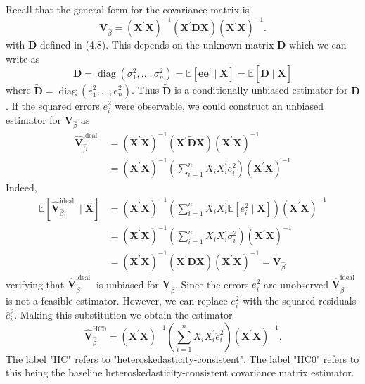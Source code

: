 \documentclass[10pt]{article}
\begin{document}
Recall that the general form for the covariance matrix is
$$
\boldsymbol{V}_{\widehat{\beta}}=\left(\boldsymbol{X}^{\prime} \boldsymbol{X}\right)^{-1}\left(\boldsymbol{X}^{\prime} \boldsymbol{D} \boldsymbol{X}\right)\left(\boldsymbol{X}^{\prime} \boldsymbol{X}\right)^{-1} .
$$
with $\boldsymbol{D}$ defined in (4.8). This depends on the unknown matrix $\boldsymbol{D}$ which we can write as
$$
\boldsymbol{D}=\operatorname{diag}\left(\sigma_{1}^{2}, \ldots, \sigma_{n}^{2}\right)=\mathbb{E}\left[\boldsymbol{e} \boldsymbol{e}^{\prime} \mid \boldsymbol{X}\right]=\mathbb{E}[\widetilde{\boldsymbol{D}} \mid \boldsymbol{X}]
$$
where $\widetilde{\boldsymbol{D}}=\operatorname{diag}\left(e_{1}^{2}, \ldots, e_{n}^{2}\right)$. Thus $\widetilde{\boldsymbol{D}}$ is a conditionally unbiased estimator for $\boldsymbol{D}$. If the squared errors $e_{i}^{2}$ were observable, we could construct an unbiased estimator for $\boldsymbol{V}_{\widehat{\beta}}$ as
$$
\begin{aligned}
\widehat{\boldsymbol{V}}_{\widehat{\beta}}^{\text {ideal }} &=\left(\boldsymbol{X}^{\prime} \boldsymbol{X}\right)^{-1}\left(\boldsymbol{X}^{\prime} \widetilde{\boldsymbol{D}} \boldsymbol{X}\right)\left(\boldsymbol{X}^{\prime} \boldsymbol{X}\right)^{-1} \\
&=\left(\boldsymbol{X}^{\prime} \boldsymbol{X}\right)^{-1}\left(\sum_{i=1}^{n} X_{i} X_{i}^{\prime} e_{i}^{2}\right)\left(\boldsymbol{X}^{\prime} \boldsymbol{X}\right)^{-1}
\end{aligned}
$$
Indeed,
$$
\begin{aligned}
\mathbb{E}\left[\widehat{\boldsymbol{V}}_{\widehat{\beta}}^{\text {ideal }} \mid \boldsymbol{X}\right] &=\left(\boldsymbol{X}^{\prime} \boldsymbol{X}\right)^{-1}\left(\sum_{i=1}^{n} X_{i} X_{i}^{\prime} \mathbb{E}\left[e_{i}^{2} \mid \boldsymbol{X}\right]\right)\left(\boldsymbol{X}^{\prime} \boldsymbol{X}\right)^{-1} \\
&=\left(\boldsymbol{X}^{\prime} \boldsymbol{X}\right)^{-1}\left(\sum_{i=1}^{n} X_{i} X_{i}^{\prime} \sigma_{i}^{2}\right)\left(\boldsymbol{X}^{\prime} \boldsymbol{X}\right)^{-1} \\
&=\left(\boldsymbol{X}^{\prime} \boldsymbol{X}\right)^{-1}\left(\boldsymbol{X}^{\prime} \boldsymbol{D} \boldsymbol{X}\right)\left(\boldsymbol{X}^{\prime} \boldsymbol{X}\right)^{-1}=\boldsymbol{V}_{\widehat{\beta}}
\end{aligned}
$$
verifying that $\widehat{\boldsymbol{V}}_{\widehat{\beta}}^{\text {ideal }}$ is unbiased for $\boldsymbol{V}_{\widehat{\beta}}$. Since the errors $e_{i}^{2}$ are unobserved $\widehat{\boldsymbol{V}}_{\widehat{\beta}}^{\text {ideal }}$ is not a feasible estimator. However, we can replace $e_{i}^{2}$ with the squared residuals $\widehat{e}_{i}^{2}$. Making this substitution we obtain the estimator
$$
\widehat{\boldsymbol{V}}_{\widehat{\beta}}^{\mathrm{HC} 0}=\left(\boldsymbol{X}^{\prime} \boldsymbol{X}\right)^{-1}\left(\sum_{i=1}^{n} X_{i} X_{i}^{\prime} \widehat{e}_{i}^{2}\right)\left(\boldsymbol{X}^{\prime} \boldsymbol{X}\right)^{-1} .
$$
The label "HC" refers to "heteroskedasticity-consistent". The label "HC0" refers to this being the baseline heteroskedasticity-consistent covariance matrix estimator.
\end{document}
